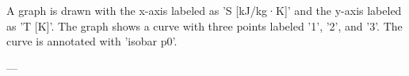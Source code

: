 A graph is drawn with the x-axis labeled as 'S [kJ/kg·K]' and the y-axis labeled as 'T [K]'. The graph shows a curve with three points labeled '1', '2', and '3'. The curve is annotated with 'isobar p0'.  

---